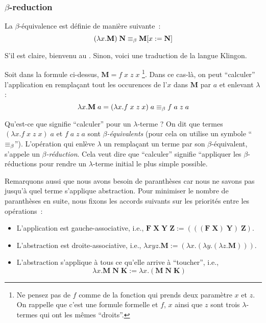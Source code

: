 \subsubsection*{$\beta$-reduction} \label{beta-reduction}

\begin{definition}
La $\beta$-équivalence est définie de manière suivante~:
	$$(\lambda x.\mathbf{M}) \; \mathbf{N} \equiv_\beta \mathbf{M}[x:=\mathbf{N}]$$
\end{definition}
S'il est claire, bienvenu au .
Sinon, voici une traduction de la langue Klingon.

Soit dans la formule ci-dessus, $\mathbf{M} = f \; x \; z \; x$
\footnote{
	Ne pensez pas de $f$ comme de la fonction qui prends deux paramètre $x$ et $z$. On rappelle que c'est une formule formelle et $f$, $x$ ainsi que $z$ sont trois $\lambda$-termes qui ont les mêmes ``droits''.
}.
Dans ce cas-là, on peut ``calculer'' l'application en remplaçant tout les occurences de l'$x$ dans $\mathbf{M}$ par $a$ et enlevant $\lambda$ :
$$\lambda x. \mathbf{M} \; a = (\lambda x. f \; x \; z \; x) \; a \equiv_\beta f \; a \; z \; a$$

Qu'est-ce que signifie ``calculer'' pour un $\lambda$-terme ?
On dit que termes $(\lambda x. f \; x \; z \; x) \; a$ et $f \; a \; z \; a$ sont \emph{$\beta$-équivalents} (pour cela on utilise un symbole ``$\equiv_\beta$'').
L'opération qui enlève $\lambda$ un remplaçant un terme par son $\beta$-équivalent, s'appele un \emph{$\beta$-réduction}.
Cela veut dire que ``calculer'' signifie ``appliquer les $\beta$-réductions pour rendre un $\lambda$-terme initial le plus simple possible.

Remarquons aussi que nous avons besoin de paranthèses car nous ne savons pas jusqu'à quel terme s'applique abstraction.
Pour minimiser le nombre de paranthèses en suite, nous fixons les accords suivants sur les priorités entre les opérations~:
\begin{itemize}
	\item L'application est gauche-associative, i.e.,
	$\mathbf{F \; X \; Y \; Z := (((F \; X) \; Y) \; Z)}$.
	\item L'abstraction est droite-associative, i.e., $\lambda x y z. \mathbf{M} := (\lambda x.(\lambda y.(\lambda z. \mathbf{M})))$.
	\item L'abstraction s'applique à tous ce qu'elle arrive à ``toucher'', i.e., $$\lambda x. \mathbf{M \; N \; K} := \lambda x.(\mathbf{M \; N \; K})$$
\end{itemize}

